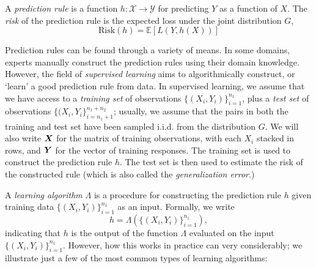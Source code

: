 A \emph{prediction rule} is a function $h: \mathcal{X} \to
\mathcal{Y}$ for predicting $Y$ as a function of $X$.  The \emph{risk}
of the prediction rule is the expected loss under the joint
distribution $G$,
\[
\text{Risk}(h) = \mathbb{E}[L(Y, h(X))]
\]

Prediction rules can be found through a variety of means.  In some
domains, experts manually construct the prediction rules using their
domain knowledge.  However, the field of \emph{supervised learning}
aims to algorithmically construct, or `learn' a good prediction rule
from data.  In supervised learning, we assume that we have access to a
\emph{training set} of observations $\{(X_i,Y_i)\}_{i=1}^{n_1}$, plus
a \emph{test set} of observations $\{(X_i,Y_i\}_{i=n_1 + 1}^{n_1 +
  n_2}$; usually, we assume that the pairs in both the training and
test set have been sampled i.i.d. from the distribution $G$.  We will
also write $\boldsymbol{X}$ for the matrix of training observations, with each
$X_i$ stacked in rows, and $\boldsymbol{Y}$ for the vector of training
responses. The training set is used to construct the prediction rule
$h$.  The test set is then used to estimate the risk of the
constructed rule (which is also called the \emph{generalization
  error}.)

A \emph{learning algorithm} $\Lambda$ is a procedure for constructing the
prediction rule $h$ given training data $\{(X_i,Y_i)\}_{i=1}^{n_1}$ as
an input.  Formally, we write
\[
h = \Lambda(\{(X_i,Y_i)\}_{i=1}^{n_1}),
\]
indicating that $h$ is the output of the function $\Lambda$ evaluated
on the input $\{(X_i,Y_i)\}_{i=1}^{n_1}$.  However, how this works in
practice can very considerably; we illustrate just a few of the most
common types of learning algorithms:

